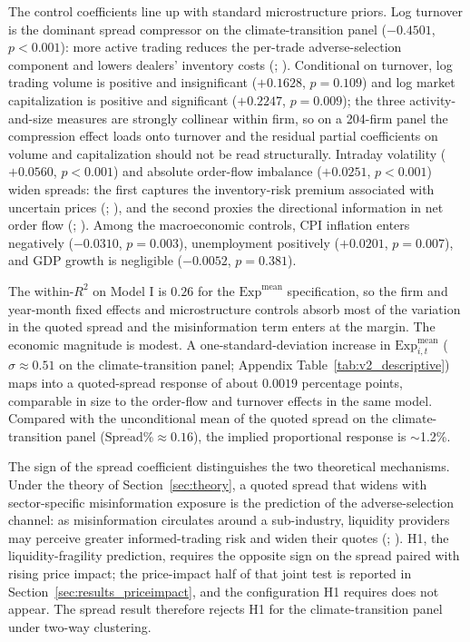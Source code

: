 \documentclass{article}
\theoremstyle{plain}
\begin{document}
The control coefficients line up with standard microstructure priors. Log turnover is the dominant spread compressor on the climate-transition panel ($-0.4501$, $p<0.001$): more active trading reduces the per-trade adverse-selection component and lowers dealers' inventory costs (\cite{stoll2000friction}; \cite{chordia2000commonality}). Conditional on turnover, log trading volume is positive and insignificant ($+0.1628$, $p=0.109$) and log market capitalization is positive and significant ($+0.2247$, $p=0.009$); the three activity-and-size measures are strongly collinear within firm, so on a 204-firm panel the compression effect loads onto turnover and the residual partial coefficients on volume and capitalization should not be read structurally. Intraday volatility ($+0.0560$, $p<0.001$) and absolute order-flow imbalance ($+0.0251$, $p<0.001$) widen spreads: the first captures the inventory-risk premium associated with uncertain prices (\cite{Hasbrouck1991}; \cite{AmihudMendelson1986}), and the second proxies the directional information in net order flow (\cite{Kyle1985}; \cite{easley1996}). Among the macroeconomic controls, CPI inflation enters negatively ($-0.0310$, $p=0.003$), unemployment positively ($+0.0201$, $p=0.007$), and GDP growth is negligible ($-0.0052$, $p=0.381$).

The within-$R^2$ on Model I is $0.26$ for the $\mathrm{Exp}^{\text{mean}}$ specification, so the firm and year-month fixed effects and microstructure controls absorb most of the variation in the quoted spread and the misinformation term enters at the margin. The economic magnitude is modest. A one-standard-deviation increase in $\mathrm{Exp}^{\text{mean}}_{i,t}$ ($\sigma \approx 0.51$ on the climate-transition panel; Appendix Table~\ref{tab:v2_descriptive}) maps into a quoted-spread response of about $0.0019$ percentage points, comparable in size to the order-flow and turnover effects in the same model. Compared with the unconditional mean of the quoted spread on the climate-transition panel ($\overline{\text{Spread\%}} \approx 0.16$), the implied proportional response is $\sim$1.2\%.

The sign of the spread coefficient distinguishes the two theoretical mechanisms. Under the theory of Section~\ref{sec:theory}, a quoted spread that widens with sector-specific misinformation exposure is the prediction of the adverse-selection channel: as misinformation circulates around a sub-industry, liquidity providers may perceive greater informed-trading risk and widen their quotes (\cite{GlostenMilgrom1985}; \cite{EasleyOHara1992}). H1, the liquidity-fragility prediction, requires the opposite sign on the spread paired with rising price impact; the price-impact half of that joint test is reported in Section~\ref{sec:results_priceimpact}, and the configuration H1 requires does not appear. The spread result therefore rejects H1 for the climate-transition panel under two-way clustering.
\end{document}
